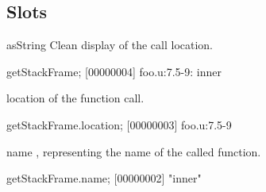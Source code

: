 \subsection{Slots}

\begin{urbiscriptapi}
\item[asString] Clean display of the call location.
\begin{urbiscript}
getStackFrame;
[00000004] foo.u:7.5-9: inner
\end{urbiscript}


\item[location]  of the function call.
\begin{urbiscript}
getStackFrame.location;
[00000003] foo.u:7.5-9
\end{urbiscript}


\item[name] , representing the name of the called
  function.
\begin{urbiscript}
getStackFrame.name;
[00000002] "inner"
\end{urbiscript}
\end{urbiscriptapi}


